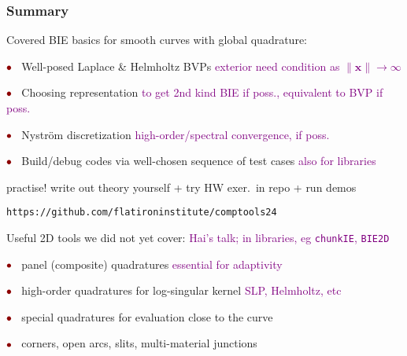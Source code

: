 \documentclass[t]{beamer}
\newcommand{\ft}[1]{\frametitle{#1}}
\newcommand{\ben}{\begin{enumerate}}
\newcommand{\een}{\end{enumerate}}
\newcommand{\mbf}[1]{{\bm #1}}           %
\newcommand{\com}[1]{{\scriptsize \textcolor{purple}{#1}}}      %
\newcommand{\vg}{\vspace{2ex}}
\newcommand{\sg}{\vspace{1ex}}
\newcommand{\dr}[1]{{\color{darkred}#1}}    %
\newcommand{\rb}{\ensuremath{\textcolor{darkred}{\bullet\;}}\ }
\newcommand{\xx}{\mbf{x}}
\begin{document}
%
%  
%  
%
%
%




\begin{frame}\ft{Summary}

  Covered BIE basics for smooth curves with global quadrature:

\sg
  
  \rb Well-posed Laplace \& Helmholtz BVPs\hfill
 \com{exterior need condition as $\|\xx\|\to\infty$}
  
  \rb Choosing representation \hfill \com{to get 2nd kind BIE if poss., equivalent to BVP if poss.}

  \qquad \com{Can switch interior/exterior, Laplace/Helmholtz/etc, via simple code changes}
  
  \rb Nystr\"om discretization \hfill \com{high-order/spectral convergence, if poss.}

  \rb Build/debug codes via well-chosen sequence of test cases
  \hfill\com{also for libraries}

  \sg
  
  \dr{\small practise! write out theory yourself + try HW exer.\ in repo + run demos}

\hfill\dr{\small \tt https://github.com/flatironinstitute/comptools24}

  

\pause
\vg

Useful 2D tools we did not yet cover:
\hfill\com{Hai's talk; in libraries, eg {\tt chunkIE}, {\tt BIE2D}}

\sg

\rb panel (composite) quadratures \hfill\com{essential for adaptivity}

\rb high-order quadratures for log-singular kernel \hfill\com{SLP, Helmholtz, etc}

\rb special quadratures for evaluation close to the curve

 \qquad\com{some need interpolation of $\sigma(t)$ off the nodes $t_j$, some not}

 \rb corners, open arcs, slits, multi-material junctions

  


  


  
\end{frame}
\end{document}
